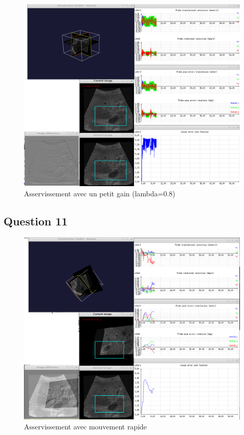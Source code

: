 \documentclass[a4paper,11pt]{article}
\begin{document}
\begin{figure}[H]
    \centering
    \includegraphics[width=1.0\textwidth]{./images/q10_big.png}
    \caption{Asservissement avec un petit gain (lambda=0.8)}
    \label{bigGain}
\end{figure}

\subsection{Question 11}
\begin{figure}[H]
    \centering
    \includegraphics[width=1.0\textwidth]{./images/q11_0,4.png}
    \caption{Asservissement avec mouvement rapide }
    \label{fastMove}
\end{figure}
\end{document}
